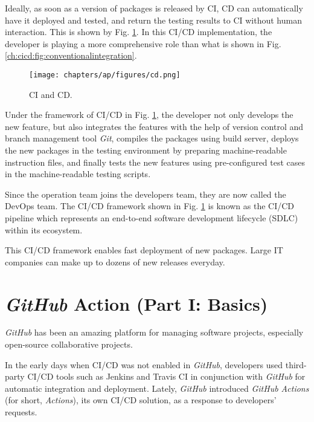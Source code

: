 Ideally, as soon as a version of packages is released by CI, CD can automatically have it deployed and tested, and return the testing results to CI without human interaction. This is shown by Fig. \ref{ch:cicd:fig:cd}. In this CI/CD implementation, the developer is playing a more comprehensive role than what is shown in Fig. \ref{ch:cicd:fig:conventionalintegration}.
\begin{figure}[htbp]
	\centering
	\texttt{[image: chapters/ap/figures/cd.png]}
	\caption{CI and CD.} \label{ch:cicd:fig:cd}
\end{figure}

Under the framework of CI/CD in Fig. \ref{ch:cicd:fig:cd}, the developer not only develops the new feature, but also integrates the features with the help of version control and branch management tool \textit{Git}, compiles the packages using build server, deploys the new packages in the testing environment by preparing machine-readable instruction files, and finally tests the new features using pre-configured test cases in the machine-readable testing scripts.

Since the operation team joins the developers team, they are now called the DevOps team. The CI/CD framework shown in Fig. \ref{ch:cicd:fig:cd} is known as the CI/CD pipeline which represents an end-to-end software development lifecycle (SDLC) within its ecosystem.

This CI/CD framework enables fast deployment of new packages. Large IT companies can make up to dozens of new releases everyday.

\section{\textit{GitHub} Action (Part I: Basics)}

\textit{GitHub} has been an amazing platform for managing software projects, especially open-source collaborative projects.

In the early days when CI/CD was not enabled in \textit{GitHub}, developers used third-party CI/CD tools such as Jenkins and Travis CI in conjunction with \textit{GitHub} for automatic integration and deployment. Lately, \textit{GitHub} introduced \textit{GitHub Actions} (for short, \textit{Actions}), its own CI/CD solution, as a response to developers' requests.

